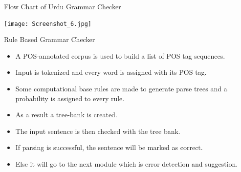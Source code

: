 \documentclass{beamer}
\begin{document}
\begin{frame}{Flow Chart of Urdu Grammar Checker}
\begin{center}
	\texttt{[image: Screenshot\_6.jpg]}	
\end{center}
\end{frame}


\begin{frame}{Rule Based Grammar Checker}
	\begin{itemize}
	\item  A POS-annotated corpus is used to build a list of POS tag sequences. \\
	\vspace{0.5em}
	\item  Input is tokenized and every word is assigned with its POS tag. \\
	\vspace{0.5em}
	\item  Some computational base rules are made to generate parse trees and a probability is assigned to every rule. \\
	\vspace{0.5em}
	\item  As a result a tree-bank is created. \\
	\vspace{0.5em} 
	\item  The input sentence is then checked with the tree bank. \\
	\vspace{0.5em}
	\item  If parsing is successful, the sentence will be marked as correct. \\
	\vspace{0.5em}
	\item  Else it will go to the next module which is error detection and suggestion.
	\end{itemize}
\end{frame}
\end{document}
